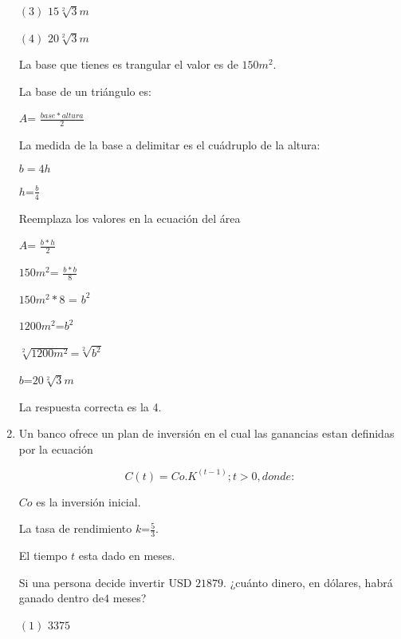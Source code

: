 \documentclass[11pt, a4paper]{article} %
\theoremstyle{dotlessP}
\theoremstyle{dotlessS}
\begin{document}
\begin{enumerate}[label=\color{dg}\theenumi.]
{        \((3)\)  \(15\sqrt[2]{3} m\) 
        
        \((4)\) \(20\sqrt[2]{3} m\) }
        
        La base que tienes es trangular el valor es de \(150m^2\).
        
        La base de un triángulo es:
   
   \begin{center}
     \(A\)= \( \frac{base*altura}{2}\)
       \end{center}
       
        
       La medida de la base a delimitar es el cuádruplo de la altura:
       \begin{center}
       
       \(b=4h\) 
      
      \(h\)=\(\frac{b}{4}\)
      \end{center}
       
       Reemplaza los valores en la ecuación del área
       
       
       \(A\)= \( \frac{b*h}{2}\)
      
    \(150m^2\)= \( \frac{b*b}{8}\)
    
           \(150m^2*8\)  = \( b^2\)
           
           \(1200m^2\)=\(b^2\)
           
         \(\sqrt[2]{1200m^2}\)=\(\sqrt[2]{b^2}\)
         
         \(b\)=\(20\sqrt[2]{3} m\)
           
           
       
        {\color{dh}La respuesta correcta es la 4.}
		\item{\color{db}
        Un banco ofrece un plan de inversión en el cual las ganancias estan definidas por la ecuación 
        
        \[ C(t)= Co.K^{(t-1)} ; t>0, donde:\]
        
        \(Co\) es la inversión inicial.
        
      La tasa de rendimiento \(k\)=\(\frac{5}{3}\).
      
      El tiempo \(t\) esta dado en meses.
        
       Si una persona decide invertir USD \(21879\). ¿cuánto dinero, en dólares, habrá ganado dentro de\(4\) meses?}
       
        {\color{dh} \((1)\) \(3375\)
        
}
\end{enumerate}
\end{document}
